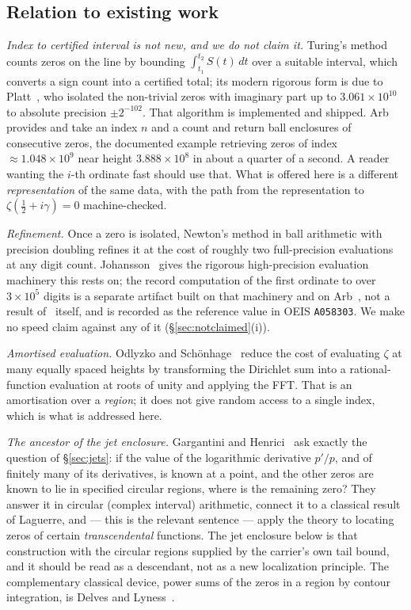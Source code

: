 \documentclass[11pt]{article}
\theoremstyle{plain}
\theoremstyle{definition}
\theoremstyle{remark}
\newcommand{\lean}[1]{\texttt{\detokenize{#1}}}
\begin{document}
\subsection*{Relation to existing work}\label{sec:related}
\emph{Index to certified interval is not new, and we do not claim it.} Turing's method~\cite{Turing1953}
counts zeros on the line by bounding $\int_{t_1}^{t_2}S(t)\,dt$ over a suitable
interval, which converts a sign count into a certified total; its modern rigorous form
is due to Platt~\cite{Platt2017}, who isolated the non-trivial zeros with imaginary part up to
$3.061\times10^{10}$ to absolute precision $\pm2^{-102}$. That algorithm is implemented
and shipped. Arb~\cite{Johansson2017} provides
\lean{acb_dirichlet_hardy_z_zeros} and
\lean{acb_dirichlet_platt_hardy_z_zeros} take an index $n$ and a count and return
ball enclosures of consecutive zeros, the documented example retrieving zeros of index
$\approx1.048\times10^{9}$ near height $3.888\times10^{8}$ in about a quarter of a
second. A reader wanting the $i$-th ordinate fast should use that. What is offered here
is a different \emph{representation} of the same data, with the path from the
representation to $\zeta(\tfrac12+i\gamma)=0$ machine-checked.

\emph{Refinement.} Once a zero is isolated, Newton's method in ball arithmetic with
precision doubling refines it at the cost of roughly two full-precision evaluations at
any digit count. Johansson~\cite{Johansson2015} gives the rigorous high-precision
evaluation machinery this rests on; the record computation of the first ordinate to
over $3\times10^{5}$ digits is a separate artifact built on that machinery and on
Arb~\cite{Johansson2017}, not a result of~\cite{Johansson2015} itself, and is recorded
as the reference value in OEIS \texttt{A058303}. We make no speed claim against any of
it (\S\ref{sec:notclaimed}(i)).

\emph{Amortised evaluation.} Odlyzko and Sch\"onhage~\cite{OdlyzkoSchonhage1988} reduce
the cost of evaluating $\zeta$ at many equally spaced heights by transforming the
Dirichlet sum into a rational-function evaluation at roots of unity and applying the
FFT. That is an amortisation over a \emph{region}; it does not give random access to a
single index, which is what is addressed here.

\emph{The ancestor of the jet enclosure.} Gargantini and
Henrici~\cite{GargantiniHenrici1971} ask exactly the question of \S\ref{sec:jets}: if
the value of the logarithmic derivative $p'/p$, and of finitely many of its
derivatives, is known at a point, and the other zeros are known to lie in specified
circular regions, where is the remaining zero? They answer it in circular (complex
interval) arithmetic, connect it to a classical result of Laguerre, and --- this is the
relevant sentence --- apply the theory to locating zeros of certain \emph{transcendental}
functions. The jet enclosure below is that construction with the circular regions
supplied by the carrier's own tail bound, and it should be read as a descendant, not as
a new localization principle. The complementary classical device, power sums of the
zeros in a region by contour integration, is Delves and Lyness~\cite{DelvesLyness1967}.
\end{document}
